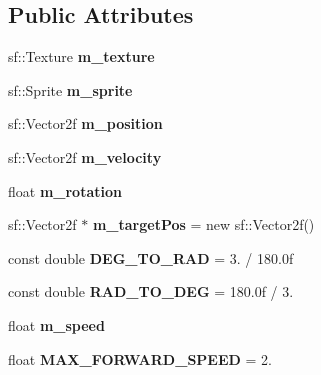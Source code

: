 \subsection*{Public Attributes}
\begin{DoxyCompactItemize}
\item 
\mbox{\label{class_enemy_a7ecda579b1a8484065eaccc462b11f14}} 
sf\+::\+Texture {\bfseries m\+\_\+texture}
\item 
\mbox{\label{class_enemy_a7b35b20d1fa3208496ab90487e5e4c9c}} 
sf\+::\+Sprite {\bfseries m\+\_\+sprite}
\item 
\mbox{\label{class_enemy_a641daa5c5c35b3b349e8c6be03ba7003}} 
sf\+::\+Vector2f {\bfseries m\+\_\+position}
\item 
\mbox{\label{class_enemy_a52c49c60d7801b24c2abcf7776c51aaf}} 
sf\+::\+Vector2f {\bfseries m\+\_\+velocity}
\item 
\mbox{\label{class_enemy_a7915d94ec731981472231b56b7324926}} 
float {\bfseries m\+\_\+rotation}
\item 
\mbox{\label{class_enemy_a36955f16c7bdbe9d13f4c8defbf3e58a}} 
sf\+::\+Vector2f $\ast$ {\bfseries m\+\_\+target\+Pos} = new sf\+::\+Vector2f()
\item 
\mbox{\label{class_enemy_a0cd3ba52fbaad2d7302b3e558c60c340}} 
const double {\bfseries D\+E\+G\+\_\+\+T\+O\+\_\+\+R\+AD} = 3. / 180.\+0f
\item 
\mbox{\label{class_enemy_ab83fa33bf13cb90576377804afabbed9}} 
const double {\bfseries R\+A\+D\+\_\+\+T\+O\+\_\+\+D\+EG} = 180.\+0f / 3.
\item 
\mbox{\label{class_enemy_a4c170e25a9a7057ef2890c4a8a994fe6}} 
float {\bfseries m\+\_\+speed}
\item 
\mbox{\label{class_enemy_a57a64268785eedf670abaadcf921a80c}} 
float {\bfseries M\+A\+X\+\_\+\+F\+O\+R\+W\+A\+R\+D\+\_\+\+S\+P\+E\+ED} = 2.
\item 
\mbox{\label{class_enemy_abace3f13f476b8e343bebf81d398dc30}} 

\end{DoxyCompactItemize}
